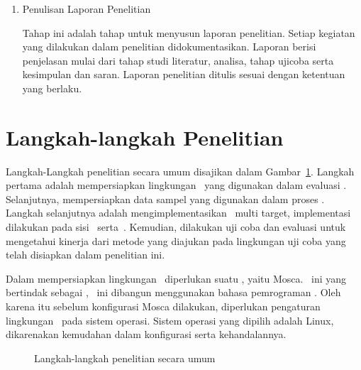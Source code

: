 \begin{enumerate}
  \item Penulisan Laporan Penelitian

    Tahap ini adalah tahap untuk menyusun laporan penelitian. Setiap kegiatan
    yang dilakukan dalam penelitian didokumentasikan. Laporan berisi penjelasan
    mulai dari tahap studi literatur, analisa, tahap ujicoba serta kesimpulan
    dan saran.  Laporan penelitian ditulis sesuai dengan ketentuan yang berlaku.

\end{enumerate}


\section{Langkah-langkah Penelitian}

Langkah-Langkah penelitian secara umum disajikan dalam Gambar~\ref{fig:langkah}.
Langkah pertama adalah mempersiapkan lingkungan \testbed~yang digunakan dalam
evaluasi \pubsub. Selanjutnya, mempersiapkan data sampel yang digunakan dalam
proses \tracking.  Langkah selanjutnya adalah mengimplementasikan
\tracking~multi target, implementasi dilakukan pada sisi \client~serta~\server.
Kemudian, dilakukan uji coba dan evaluasi untuk mengetahui kinerja dari metode
yang diajukan pada lingkungan uji coba yang telah disiapkan dalam penelitian
ini.

Dalam mempersiapkan lingkungan \pubsub~diperlukan suatu \middleware, yaitu
Mosca. \Middleware~ini yang bertindak sebagai \broker, \middleware~ini dibangun
menggunakan bahasa pemrograman \nodejs.  Oleh karena itu sebelum konfigurasi
Mosca dilakukan, diperlukan pengaturan lingkungan \nodejs~pada sistem operasi.
Sistem operasi yang dipilih adalah Linux, dikarenakan kemudahan dalam
konfigurasi serta kehandalannya.

\begin{figure}
  \centering
\caption{Langkah-langkah penelitian secara umum}
\label{fig:langkah}
\end{figure}

